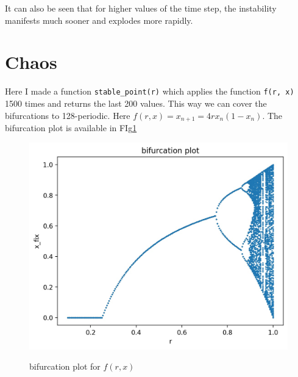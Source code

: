 \documentclass[12pt, a4paper]{article}
\begin{document}
	It can also be seen that for higher values of the time step, the instability manifests much sooner and explodes more rapidly.

	\section{Chaos}
	Here I made a function \texttt{stable\_point(r)} which applies the function \texttt{f(r, x)} 1500 times and returns the last 200 values.
	This way we can cover the bifurcations to 128-periodic. Here $f(r, x) = x_{n + 1} = 4rx_{n} (1 - x_{n})$.  The bifurcation plot is available in FIg\ref{fig:bifurcation}
	\begin{figure}[h!]
		\centering
		\includegraphics[width=0.9\linewidth]{../p4/bifurcation.jpg}
		\label{fig:bifurcation}
		\caption{bifurcation plot for $f(r, x)$}
	\end{figure}
\end{document}
